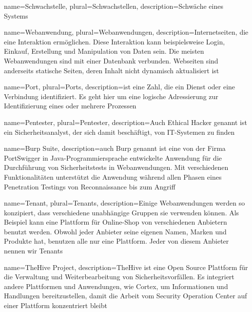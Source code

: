  {
    name={Schwachstelle},
    plural={Schwachstellen},
    description={Schwäche eines Systems \citep{Wendzel_It-Sicherheit}}
}

 {
    name={Webanwendung},
    plural={Webanwendungen},
    description={Internetseiten, die eine Interaktion ermöglichen. Diese Interaktion kann beispielsweise Login, Einkauf, Erstellung und Manipulation von Daten sein. Die meisten Webanwendungen sind mit einer Datenbank verbunden. Webseiten sind anderseits statische Seiten, deren Inhalt nicht dynamisch aktualisiert ist \citep{Essential_Desigs_Seite_x_Anwendung}}
}

 {
    name={Port},
    plural={Ports},
    description={ist eine Zahl, die ein Dienst oder eine Verbindung identifiziert. Es geht hier um eine logische Adressierung zur Identifizierung eines oder mehrere Prozessen \citep{porttanenbaum}}
}

 {
    name={Pentester},
    plural={Pentester},
    description={Auch Ethical Hacker genannt ist ein Sicherheitsanalyst, der sich damit beschäftigt,   von IT-Systemen zu finden \citep{pentester}}   
}

 {
    name={Burp Suite},
    description={auch Burp genannt ist eine von der Firma PortSwigger in Java-Programmiersprache entwickelte Anwendung für die Durchführung von Sicherheitstests in Webanwendungen. Mit verschiedenen Funktionalitäten unterstützt die Anwendung während allen Phasen eines Penetration Testings von Reconnaissance bis zum Angriff \citep{burp}}   
}

 {
    name={Tenant},
    plural={Tenants},
    description={Einige Webanwendungen werden so konzipiert, dass verschiedene unabhängige Gruppen sie verwenden können. Als Beispiel kann eine Plattform für Online-Shop von verschiedenen Anbietern benutzt werden. Obwohl jeder Anbieter seine eigenen Namen, Marken und Produkte hat, benutzen alle nur eine Plattform. Jeder von diesem Anbieter nennen wir Tenants}   
}

 {
    name={TheHive Project},
    description={TheHive ist eine Open Source Plattform für die Verwaltung und Weiterbearbeitung von Sicherheitsvorfällen. Es integriert andere Plattformen und Anwendungen, wie Cortex, um Informationen und Handlungen bereitzustellen, damit die Arbeit vom Security Operation Center auf einer Plattform konzentriert bleibt \citep{TheHive}}   
}

